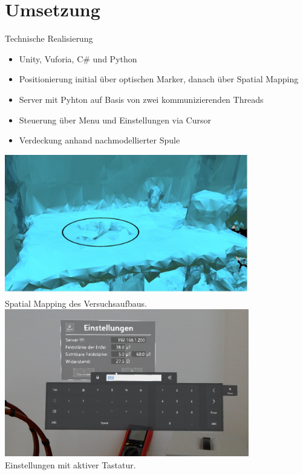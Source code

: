 \part{Umsetzung}
\begin{frame}[fragile]{Technische Realisierung}
\begin{minipage}{0.5\textwidth}
	{
		\begin{itemize}[itemsep=1mm]
			\item Unity, Vuforia, C\# und Python
			\item Positionierung initial über optischen Marker, danach über Spatial Mapping			
			\item Server mit Pyhton auf Basis von zwei kommunizierenden Threads
			\item Steuerung über Menu und Einstellungen via Cursor
			\item Verdeckung anhand nachmodellierter Spule
		\end{itemize}
	}
\end{minipage}
\begin{minipage}{0.45\textwidth}
	\centering
	\includegraphics[width=0.8\textwidth]{images/HL/mesh.JPG}\\
	\scriptsize Spatial Mapping des Versuchsaufbaus.
	\includegraphics[width=0.8\textwidth]{images/HL/settings_c.jpg}\\
	\scriptsize Einstellungen mit aktiver Tastatur.
\end{minipage}
\end{frame}

